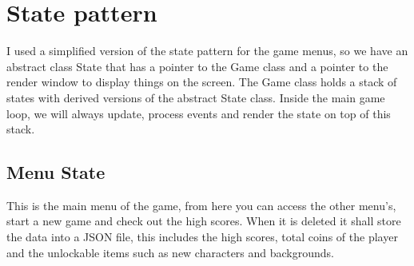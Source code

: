 \documentclass{report}
\begin{document}
\section{State pattern}
I used a simplified version of the state pattern for the game menus, so we have an abstract class State that has a pointer to the Game class and a pointer to the render window to display things on the screen. The Game class holds a stack of states with derived versions of the abstract State class. Inside the main game loop, we will always update, process events and render the state on top of this stack.

\begin{figure}[!tbp]
  \centering
  \hfill
\end{figure}

\subsection{Menu State}
This is the main menu of the game, from here you can access the other menu's, start a new game and check out the high scores. When it is deleted it shall store the data into a JSON file, this includes the high scores, total coins of the player and the unlockable items such as new characters and backgrounds.
\end{document}
